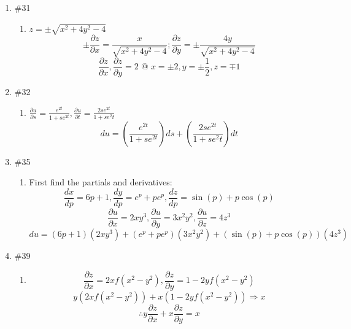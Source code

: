 \documentclass[12pt]{article}
\begin{document}
\begin{enumerate}
\begin{enumerate}
    \end{enumerate}

    \item \#31 \begin{enumerate}

        \item $z=\pm \sqrt{x^2+4y^2-4}$
          $$\pm\frac{\partial z}{\partial x}=\frac{x}{\sqrt{x^2+4y^2-4}}; \frac{\partial z}{\partial y} = \pm \frac{4y}{\sqrt{x^2+4y^2-4}}$$
          $$\frac{\partial z}{\partial x}, \frac{\partial z}{\partial y} = 2\text{ @ }x=\pm2, y=\pm\frac{1}{2}, z=\mp1$$
      \end{enumerate}

    \item \#32 \begin{enumerate}

        \item $\frac{\partial u}{\partial s}=\frac{e^{2t}}{1+se^{2t}}, \frac{\partial u}{\partial t}=\frac{2se^{2t}}{1+se^2t}$
          $$du=(\frac{e^{2t}}{1+se^{2t}})ds+(\frac{2se^{2t}}{1+se^2t})dt$$ 

      \end{enumerate}

    \item \#35 \begin{enumerate}

        \item First find the partials and derivatives:
          $$\frac{dx}{dp}=6p+1,\frac{dy}{dp}=e^p+pe^p,\frac{dz}{dp}=\sin(p)+p\cos(p)$$
          $$\frac{\partial u}{\partial x}=2xy^3, \frac{\partial u}{\partial y}=3x^2y^2,\frac{\partial u}{\partial z}=4z^3$$
          $$du=(6p+1)(2xy^3)+(e^p+pe^p)(3x^2y^2)+(\sin(p)+p\cos(p))(4z^3)$$

      \end{enumerate}

    \item \#39 \begin{enumerate}

        \item $$\frac{\partial z}{\partial x}=2xf(x^2-y^2), \frac{\partial z}{\partial y}=1-2yf(x^2-y^2)$$
          $$y(2xf(x^2-y^2))+x(1-2yf(x^2-y^2))\Longrightarrow x$$
          $$\therefore y\frac{\partial z}{\partial x}+x\frac{\partial z}{\partial y}=x$$

      \end{enumerate}



\end{enumerate}
\end{document}
